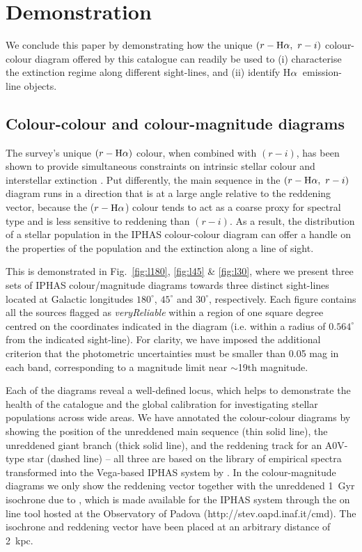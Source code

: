 \documentclass[useAMS,usenatbib]{mn2e}
\def\ha{\mbox{H$\rm \alpha$}}
\begin{document}
\section{Demonstration}
\label{sec:demonstration}

We conclude this paper by demonstrating how the unique
$(r-\ha,\ r-i)$ colour-colour diagram offered by this catalogue
can readily be used to
(i) characterise the extinction regime along different sight-lines, and
(ii) identify \ha\ emission-line objects.

\subsection{Colour-colour and colour-magnitude diagrams}

The survey's unique $(r-\ha)$ colour,
when combined with $(r-i)$,
has been shown to provide simultaneous constraints 
on intrinsic stellar colour and interstellar extinction \citep{Drew2008}. 
Put differently, the main sequence in the $(r-\ha,\ r-i)$ diagram
runs in a direction that is at a large angle relative to the reddening vector,
because the ($r-\ha$) colour tends to act
as a coarse proxy for spectral type
and is less sensitive to reddening than $(r-i)$.
As a result, the distribution of a stellar population
in the IPHAS colour-colour diagram
can offer a handle on the properties of the population
and the extinction along a line of sight.

This is demonstrated 
in Fig.~\ref{fig:l180}, \ref{fig:l45} \& \ref{fig:l30},
where we present three sets of IPHAS colour/magnitude diagrams
towards three distinct sight-lines
located at Galactic longitudes 
$180^\circ$, $45^\circ$ and $30^\circ$, respectively.
Each figure contains all the sources
flagged as \emph{veryReliable} within a region of one square degree 
centred on the coordinates indicated in the diagram
(i.e. within a radius of $0.564^\circ$ from the indicated sight-line).
For clarity, we have imposed the additional criterion
that the photometric uncertainties
must be smaller than 0.05 mag in each band,
corresponding to a magnitude limit near $\sim$19th magnitude.

Each of the diagrams reveal a well-defined locus,
which helps to demonstrate the health of the catalogue and the 
global calibration
for investigating stellar populations across wide areas.
We have annotated the colour-colour diagrams
by showing the position 
of the unreddened main sequence (thin solid line),
the unreddened giant branch (thick solid line),
and the reddening track for an A0V-type star (dashed line)
-- all three are based on the \cite{Pickles1998} library 
of empirical spectra
transformed into the Vega-based IPHAS system by \cite{Drew2005}.
In the colour-magnitude diagrams we only show the reddening vector
together with the unreddened 1~Gyr isochrone due to \cite{Bressan2012},
which is made available for the IPHAS system through the
on line tool hosted at the Observatory of Padova
(http://stev.oapd.inaf.it/cmd).
The isochrone and reddening vector have been placed
at an arbitrary distance of 2~kpc.
\end{document}
